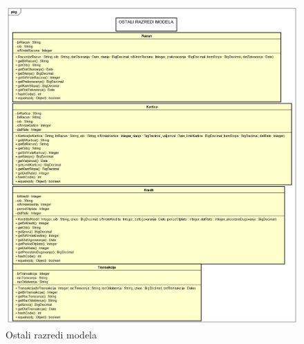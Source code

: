 			\begin{figure}[H]
				\includegraphics[scale=0.45]{Slike/Class Diagram1.PNG}
				\centering
				\caption{Ostali razredi modela}
				\label{fig:dijagram}
			\end{figure}
		
